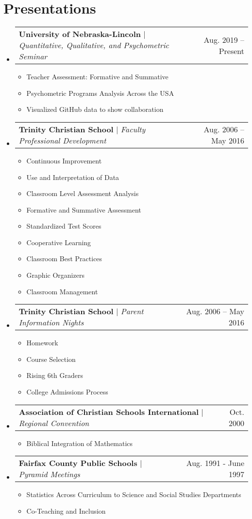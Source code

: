 \documentclass[letterpaper,11pt]{article}
\makeatletter
\newcommand{\resumeItem}[1]{
  \item\small{
    {#1 \vspace{-2pt}}
  }
}
\newcommand{\resumeProjectHeading}[2]{
    \item
    \begin{tabular*}{0.97\textwidth}{l@{\extracolsep{\fill}}r}
      \small#1 & #2 \\
    \end{tabular*}\vspace{-7pt}
}
\newcommand{\resumeSubHeadingListStart}{\begin{itemize}[leftmargin=0.15in, label={}]}
\newcommand{\resumeSubHeadingListEnd}{\end{itemize}}
\newcommand{\resumeItemListStart}{\begin{itemize}}
\newcommand{\resumeItemListEnd}{\end{itemize}\vspace{-5pt}}
\makeatother
\begin{document}
\section{Presentations}
    \resumeSubHeadingListStart
      \resumeProjectHeading
          {\textbf{University of Nebraska-Lincoln} $|$ \emph{Quantitative, Qualitative, and Psychometric Seminar}}{Aug. 2019 -- Present}
          \resumeItemListStart
            \resumeItem{Teacher Assessment: Formative and Summative}
            \resumeItem{Psychometric Programs Analysis Across the USA}
            \resumeItem{Visualized GitHub data to show collaboration}
          \resumeItemListEnd
      \resumeProjectHeading
          {\textbf{Trinity Christian School} $|$ \emph{Faculty Professional Development}}{Aug. 2006 -- May 2016}
          \resumeItemListStart
            \resumeItem{Continuous Improvement}
            \resumeItem{Use and Interpretation of Data}
            \resumeItem{Classroom Level Assessment Analysis}
            \resumeItem{Formative and Summative Assessment}
            \resumeItem{Standardized Test Scores}
            \resumeItem{Cooperative Learning}
            \resumeItem{Classroom Best Practices}
            \resumeItem{Graphic Organizers}
            \resumeItem{Classroom Management}
          \resumeItemListEnd
       \resumeProjectHeading
          {\textbf{Trinity Christian School} $|$ \emph{Parent Information Nights}}{Aug. 2006 -- May 2016}
          \resumeItemListStart
            \resumeItem{Homework}
            \resumeItem{Course Selection}
            \resumeItem{Rising 6th Graders}
            \resumeItem{College Admissions Process}
            \resumeItemListEnd
        \resumeProjectHeading
          {\textbf{Association of Christian Schools International} $|$ \emph{Regional Convention}}{Oct. 2000}
          \resumeItemListStart
          \resumeItem{Biblical Integration of Mathematics}
          \resumeItemListEnd
         \resumeProjectHeading
          {\textbf{Fairfax County Public Schools} $|$ \emph{Pyramid Meetings}}{Aug. 1991 - June 1997}
          \resumeItemListStart
          \resumeItem{Statistics Across Curriculum to Science and Social Studies Departments}
          \resumeItem{Co-Teaching and Inclusion}
          \resumeItemListEnd
    \resumeSubHeadingListEnd

%
\end{document}
